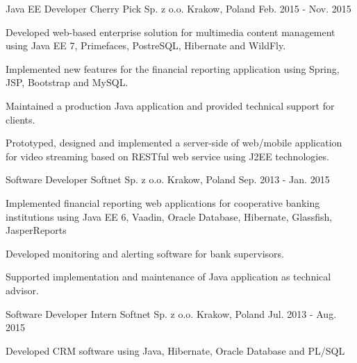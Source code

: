 \begin{cventries}
  \cventry
    {Java EE Developer} %
    {Cherry Pick Sp. z o.o.} %
    {Krakow, Poland} %
    {Feb. 2015 - Nov. 2015} %
    {
      \begin{cvitems} %
        \item {Developed web-based enterprise solution for multimedia content management using
Java EE 7, Primefaces, PostreSQL, Hibernate and WildFly.}
		\item {Implemented new features for the financial reporting application using Spring, JSP, Bootstrap and MySQL.}
		\item {Maintained a production Java application and provided technical support for clients.}
        \item {Prototyped, designed and implemented a server-side of web/mobile
application for video streaming based on RESTful web service using J2EE technologies.}
      \end{cvitems}
    }

  \cventry
    {Software Developer} %
    {Softnet Sp. z o.o.} %
    {Krakow, Poland} %
    {Sep. 2013 - Jan. 2015} %
    {
      \begin{cvitems} %
       \item {Implemented financial reporting web applications for cooperative banking institutions using Java EE 6, Vaadin, Oracle Database, Hibernate, Glassfish, JasperReports}
	  \item {Developed monitoring and alerting software for bank supervisors.} 
	  \item {Supported implementation and maintenance of Java application as technical advisor.}
      \end{cvitems}
    }
  \cventry
    {Software Developer Intern} %
    {Softnet Sp. z o.o.} %
    {Krakow, Poland} %
    {Jul. 2013 - Aug. 2015} %
    {
      \begin{cvitems} %
       \item {Developed CRM software using Java, Hibernate, Oracle Database and PL/SQL}
      \end{cvitems}
    }
\end{cventries}
